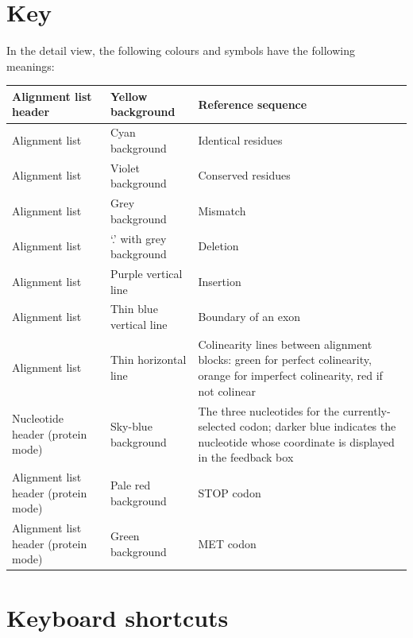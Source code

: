 \documentclass[letterpaper]{article}
\begin{document}
{\color[rgb]{0.0,0.27058825,0.5254902}\section[Key]{Key}}
\hypertarget{RefHeading2681056909880}{}{
In the detail view, the following colours and symbols have the following
meanings:}

\bigskip

\begin{flushleft}
\tablehead{}
\begin{supertabular}{p{3.8009999cm}p{3.552cm}p{6.3cm}}
 Alignment list header &  Yellow background &  Reference sequence\\\hline
 Alignment list &  Cyan background &  Identical residues\\\hline
 Alignment list & Violet background & Conserved residues\\\hline
 Alignment list & Grey background & Mismatch\\\hline
 Alignment list & {\textquoteleft}.{\textquoteright} with grey background & Deletion\\\hline
 Alignment list & Purple vertical line & Insertion\\\hline
 Alignment list & Thin blue vertical line & Boundary of an exon\\\hline
 Alignment list & Thin horizontal line & Colinearity lines between alignment blocks: green for perfect colinearity, orange for imperfect colinearity, red if not colinear\\\hline
 Nucleotide header (protein mode) & Sky-blue background & The three nucleotides for the currently-selected codon; darker blue indicates the nucleotide whose coordinate is displayed in the feedback box\\\hline
 Alignment list header (protein mode) & Pale red background & STOP codon\\\hline
 Alignment list header (protein mode) & Green background & MET codon\\
\end{supertabular}
\end{flushleft}

{\color[rgb]{0.0,0.27058825,0.5254902}\section[Keyboard shortcuts]{Keyboard shortcuts}}
\hypertarget{RefHeading2701056909880}{}
\bigskip
\end{document}
